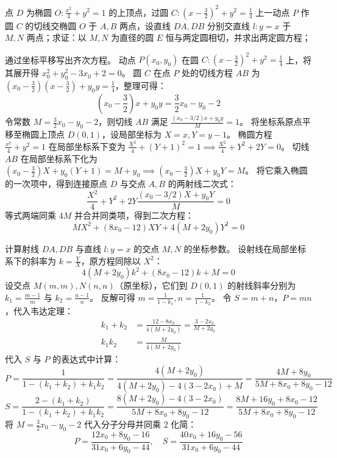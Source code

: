 \begin{exercise}
点 \(D\) 为椭圆 \(O: \frac{x^2}{4} + y^2 = 1\) 的上顶点，过圆 \(C: \left(x - \frac{3}{2}\right)^2 + y^2 = \frac{1}{4}\) 上一动点 \(P\) 作圆 \(C\) 的切线交椭圆 \(O\) 于 \(A,B\) 两点，设直线 \(DA, DB\) 分别交直线 \(l: y = x\) 于 \(M,N\) 两点；求证：以 \(M,N\) 为直径的圆 \(E\) 恒与两定圆相切，并求出两定圆方程；
\end{exercise}
\begin{solution}
通过坐标平移写出齐次方程。
动点 $P(x_0, y_0)$ 在圆 $C: (x - \frac{3}{2})^2 + y^2 = \frac{1}{4}$ 上，将其展开得 $x_0^2 + y_0^2 - 3x_0 + 2 = 0$。
圆 $C$ 在点 $P$ 处的切线方程 $AB$ 为 $(x_0 - \frac{3}{2})(x - \frac{3}{2}) + y_0 y = \frac{1}{4}$，整理可得：
$$ (x_0 - \frac{3}{2})x + y_0 y = \frac{3}{2}x_0 - y_0 - 2 $$
令常数 $M = \frac{3}{2}x_0 - y_0 - 2$，则切线 $AB$ 满足 $\frac{(x_0 - 3/2)x + y_0 y}{M} = 1$。
将坐标系原点平移至椭圆上顶点 $D(0,1)$，设局部坐标为 $X = x, Y = y - 1$。
椭圆方程 $\frac{x^2}{4} + y^2 = 1$ 在局部坐标系下变为 $\frac{X^2}{4} + (Y+1)^2 = 1 \implies \frac{X^2}{4} + Y^2 + 2Y = 0$。
切线 $AB$ 在局部坐标系下化为 $(x_0 - \frac{3}{2})X + y_0(Y+1) = M + y_0 \implies (x_0 - \frac{3}{2})X + y_0 Y = M$。
将它乘入椭圆的一次项中，得到连接原点 $D$ 与交点 $A, B$ 的两射线二次式：
$$ \frac{X^2}{4} + Y^2 + 2Y \frac{(x_0 - 3/2)X + y_0 Y}{M} = 0 $$
等式两端同乘 $4M$ 并合并同类项，得到二次方程：
$$ M X^2 + (8x_0 - 12)XY + 4(M + 2y_0)Y^2 = 0 $$

计算射线 $DA, DB$ 与直线 $l: y = x$ 的交点 $M, N$ 的坐标参数。
设射线在局部坐标系下的斜率为 $k = \frac{Y}{X}$，原方程同除以 $X^2$：
$$ 4(M + 2y_0)k^2 + (8x_0 - 12)k + M = 0 $$
设交点 $M(m,m), N(n,n)$（原坐标），它们到 $D(0,1)$ 的射线斜率分别为 $k_1 = \frac{m-1}{m}$ 与 $k_2 = \frac{n-1}{n}$。
反解可得 $m = \frac{1}{1-k_1}, n = \frac{1}{1-k_2}$。
令 $S = m+n$，$P = mn$，代入韦达定理：
\begin{align*}
k_1 + k_2 &= \frac{12 - 8x_0}{4(M + 2y_0)} = \frac{3 - 2x_0}{M + 2y_0} \\
k_1 k_2 &= \frac{M}{4(M + 2y_0)}
\end{align*}
代入 $S$ 与 $P$ 的表达式中计算：
$$ P = \frac{1}{1 - (k_1+k_2) + k_1 k_2} = \frac{4(M + 2y_0)}{4(M + 2y_0) - 4(3 - 2x_0) + M} = \frac{4M + 8y_0}{5M + 8x_0 + 8y_0 - 12} $$
$$ S = \frac{2 - (k_1+k_2)}{1 - (k_1+k_2) + k_1 k_2} = \frac{8(M + 2y_0) - 4(3 - 2x_0)}{5M + 8x_0 + 8y_0 - 12} = \frac{8M + 16y_0 + 8x_0 - 12}{5M + 8x_0 + 8y_0 - 12} $$
将 $M = \frac{3}{2}x_0 - y_0 - 2$ 代入分子分母并同乘 $2$ 化简：
$$ P = \frac{12x_0 + 8y_0 - 16}{31x_0 + 6y_0 - 44}, \quad S = \frac{40x_0 + 16y_0 - 56}{31x_0 + 6y_0 - 44} $$


\end{solution}
